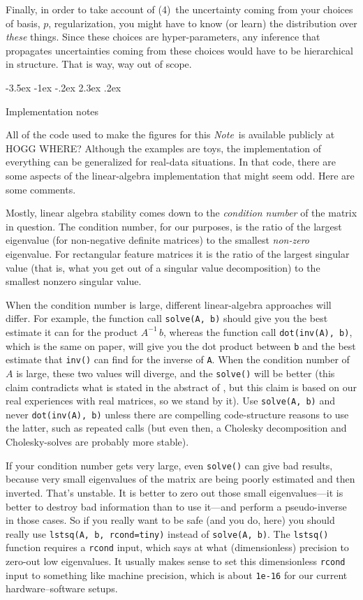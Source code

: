 \documentclass[12pt,letterpaper]{article}
\makeatletter
\renewcommand\section{\@startsection {section}{1}{\z@}%
  {-3.5ex \@plus -1ex \@minus -.2ex}%
  {2.3ex \@plus.2ex}%
  {\raggedright\normalfont\Large\bfseries}}
\newcommand{\documentname}{\textsl{Note}}
\newcommand{\code}[1]{\texttt{#1}}
\makeatother
\begin{document}
Finally, in order to take account of (4)~the uncertainty coming from your choices of basis, $p$, regularization, you might have to know (or learn) the distribution over \emph{these} things.
Since these choices are hyper-parameters, any inference that propagates uncertainties coming from these choices would have to be hierarchical in structure.
That is way, way out of scope.

\section{Implementation notes}\label{sec:implementation}

All of the code used to make the figures for this \documentname\ is available publicly at HOGG WHERE?
Although the examples are toys, the implementation of everything can be generalized for real-data situations.
In that code, there are some aspects of the linear-algebra implementation that might seem odd.
Here are some comments.

Mostly, linear algebra stability comes down to the \emph{condition number} of the matrix in question.
The condition number, for our purposes, is the ratio of the largest eigenvalue (for non-negative definite matrices) to the smallest \emph{non-zero} eigenvalue.
For rectangular feature matrices it is the ratio of the largest singular value (that is, what you get out of a singular value decomposition) to the smallest nonzero singular value.

When the condition number is large, different linear-algebra approaches will differ.
For example, the function call \code{solve(A, b)} should give you the best estimate it can for the product $A^{-1}\,b$, whereas the function call \code{dot(inv(A), b)}, which is the same on paper, will give you the dot product between \code{b} and the best estimate that \code{inv()} can find for the inverse of \code{A}.
When the condition number of $A$ is large, these two values will diverge, and the \code{solve()} will be better (this claim contradicts what is stated in the abstract of \citealt{solve}, but this claim is based on our real experiences with real matrices, so we stand by it).
Use \code{solve(A, b)} and never \code{dot(inv(A), b)} unless there are compelling code-structure reasons to use the latter, such as repeated calls (but even then, a Cholesky decomposition and Cholesky-solves are probably more stable).

If your condition number gets very large, even \code{solve()} can give bad results, because very small eigenvalues of the matrix are being poorly estimated and then inverted.
That's unstable.
It is better to zero out those small eigenvalues---it is better to destroy bad information than to use it---and perform a pseudo-inverse in those cases.
So if you really want to be safe (and you do, here) you should really use \code{lstsq(A, b, rcond=tiny)} instead of \code{solve(A, b)}.
The \code{lstsq()} function requires a \code{rcond} input, which says at what (dimensionless) precision to zero-out low eigenvalues.
It usually makes sense to set this dimensionless \code{rcond} input to something like machine precision, which is about \code{1e-16} for our current hardware--software setups.
\end{document}
